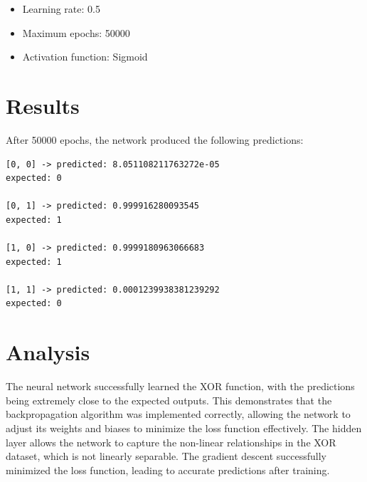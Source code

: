\documentclass[12pt]{article}
\begin{document}
\begin{itemize}
    \item Learning rate: 0.5
    \item Maximum epochs: 50000
    \item Activation function: Sigmoid
\end{itemize}

\section{Results}

After 50000 epochs, the network produced the following predictions:

\begin{verbatim}
[0, 0] -> predicted: 8.051108211763272e-05
expected: 0

[0, 1] -> predicted: 0.999916280093545
expected: 1

[1, 0] -> predicted: 0.9999180963066683
expected: 1

[1, 1] -> predicted: 0.0001239938381239292
expected: 0
\end{verbatim}

\section{Analysis}

The neural network successfully learned the XOR function, with the predictions being extremely close to the expected outputs. This demonstrates that the backpropagation algorithm was implemented correctly, allowing the network to adjust its weights and biases to minimize the loss function effectively. The hidden layer allows the network to capture the non-linear relationships in the XOR dataset, which is not linearly separable. The gradient descent successfully minimized the loss function, leading to accurate predictions after training.
\end{document}
